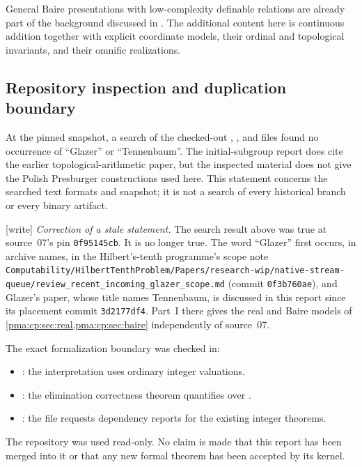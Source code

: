 \documentclass[11pt]{article}
\numberwithin{equation}{section}
\theoremstyle{definition}
\theoremstyle{remark}
\newcommand{\writetag}{\textup{\textsf{\small[write]}}}
\newcommand{\fn}[1]{\nolinkurl{#1}}
\newcommand{\codeD}[1]{\texttt{\detokenize{#1}}}
\begin{document}
General Baire presentations with low-complexity definable relations are
already part of the background discussed in \cite{EHW}. The additional
content here is continuous addition together with explicit coordinate
models, their ordinal and topological invariants, and their omnific
realizations.

\subsection{Repository inspection and duplication boundary}

At the pinned snapshot, a search of the checked-out \codeD{.tex},
\codeD{.md}, and \codeD{.lean} files found no occurrence of ``Glazer''
or ``Tennenbaum''. The initial-subgroup report does cite the earlier
topological-arithmetic paper, but the inspected material does not give
the Polish Presburger constructions used here. This statement concerns
the searched text formats and snapshot; it is not a search of every
historical branch or every binary artifact.

\noindent\writetag{} \emph{Correction of a stale statement.} The search result
above was true at source~07's pin \texttt{0f95145cb}. It is no longer true.
The word ``Glazer'' first occurs, in archive names, in the Hilbert's-tenth
programme's scope note
\fn{Computability/HilbertTenthProblem/Papers/research-wip/native-stream-queue/review_recent_incoming_glazer_scope.md}
(commit \texttt{0f3b760ae}), and Glazer's paper, whose title names
Tennenbaum, is discussed in this report since its placement commit
\texttt{3d2177df4}. Part~I there gives the real and Baire models of
\cref{pma:cp:sec:real,pma:cp:sec:baire} independently of source~07.

The exact formalization boundary was checked in:
\begin{itemize}
\item {}:
the interpretation \codeD{Formula.holds} uses ordinary integer valuations.
\item {}:
the elimination correctness theorem quantifies over \codeD{List Int}.
\item {}:
the file requests dependency reports for the existing integer theorems.
\end{itemize}
The repository was used read-only. No claim is made that this report has
been merged into it or that any new formal theorem has been accepted by
its kernel.
\end{document}
